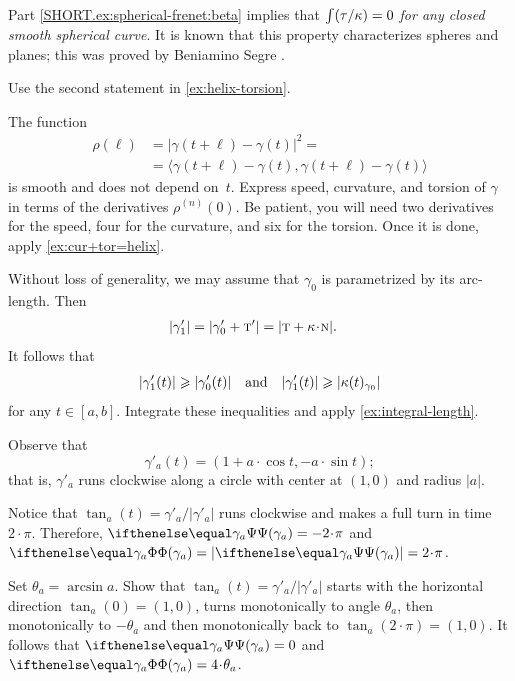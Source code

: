Part \ref{SHORT.ex:spherical-frenet:beta} implies that \textit{$\int(\tau/\kappa)=0$ for any closed smooth spherical curve}.
It is known that this property characterizes spheres and planes; this was proved by Beniamino Segre \cite{segre}.

 Use the second statement in \ref{ex:helix-torsion}.

 The function
\begin{align*}
\rho(\ell)&=|\gamma(t+\ell)-\gamma(t)|^2=
\\
&=\langle \gamma(t+\ell)-\gamma(t),\gamma(t+\ell)-\gamma(t)\rangle
\end{align*}
is smooth and does not depend on~$t$.
Express speed, curvature, and torsion of $\gamma$ in terms of the derivatives $\rho^{(n)}(0)$.
Be patient, you will need two derivatives for the speed,
four for the curvature,
and six for the torsion.
Once it is done, apply \ref{ex:cur+tor=helix}.


\setcounter{eqtn}{0}



Without loss of generality, we may assume that $\gamma_0$ is parametrized by its arc-length.
Then
\begin{align*}
|\gamma_1'|&=|\gamma_0'+\tan'|=|\tan+\kur\cdot\norm|.
\end{align*}
It follows that
\[|\gamma_1'(t)|\geqslant|\gamma_0'(t)|
\quad\text{and}\quad
|\gamma_1'(t)|\geqslant|\kappa(t)_{\gamma_0}|
\]
for any $t\in[a,b]$.
Integrate these inequalities and apply 
\ref{ex:integral-length}.


Observe that 
\[\gamma'_a(t)=(1+a\cdot \cos t, -a\cdot \sin t);\]
that is, $\gamma'_a$ runs clockwise along a circle with center at $(1,0)$ and radius $\vert a \vert$.

Notice that $\tan_a(t)=\gamma'_a/|\gamma'_a|$ runs clockwise and makes a full turn in time $2\cdot\pi$.
Therefore, $\tgc{\gamma_a}=-2\cdot\pi$ and $\tc{\gamma_a}\z=|\tgc{\gamma_a}|=2\cdot\pi$.

Set $\theta_a=\arcsin a$.
Show that $\tan_a(t)=\gamma'_a/|\gamma'_a|$ starts with the horizontal direction $\tan_a(0)=(1,0)$, turns monotonically to angle $\theta_a$, then monotonically to $-\theta_a$ and then monotonically back to $\tan_a(2\cdot\pi)=(1,0)$.
It follows that 
$\tgc{\gamma_a}=0$ and $\tc{\gamma_a}=4\cdot\theta_a$.

